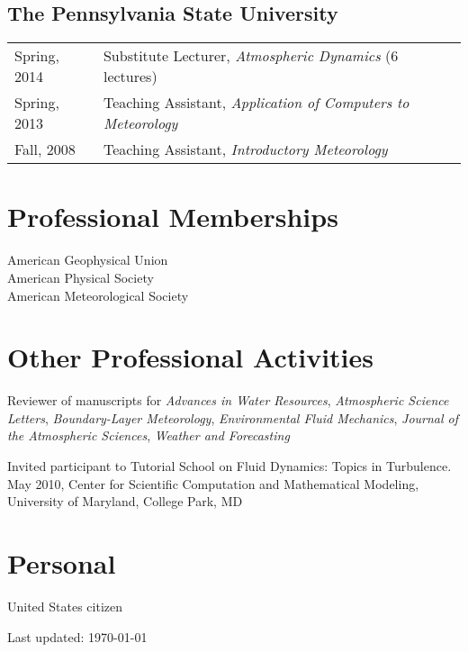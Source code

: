 \documentclass[11pt,letterpaper]{article}
\begin{document}
\subsection*{The Pennsylvania State University}

\begin{tabular}{l l}
Spring, 2014 & Substitute Lecturer, \textit{Atmospheric Dynamics} (6 lectures) \\
Spring, 2013 & Teaching Assistant, \textit{Application of Computers to Meteorology} \\
Fall, 2008 & Teaching Assistant, \textit{Introductory Meteorology} \\
\end{tabular}


\section*{Professional Memberships} 

American Geophysical Union \\
American Physical Society \\
American Meteorological Society 


\section*{Other Professional Activities} 
Reviewer of manuscripts for \textit{Advances in Water Resources}, \textit{Atmospheric Science Letters}, \textit{Boundary-Layer Meteorology}, \textit{Environmental Fluid Mechanics}, \textit{Journal of the Atmospheric Sciences}, \textit{Weather and Forecasting} 

Invited participant to Tutorial School on Fluid Dynamics: Topics in Turbulence. May 2010, Center for Scientific Computation and Mathematical Modeling, University of Maryland, College Park, MD 

\section*{Personal} 
United States citizen

\bigskip
{\small Last updated: \today}
\end{document}
